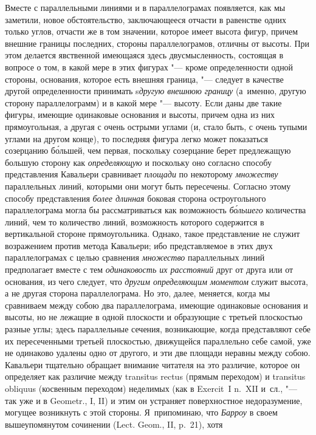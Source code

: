 Вместе с параллельными линиями и в параллелограмах появляется, как мы заметили,
новое обстоятельство, заключающееся отчасти в равенстве одних только углов,
отчасти же в том значении, которое имеет высота фигур, причем внешние границы
последних, стороны параллелограмов, отличны от высоты. При этом делается
явственной имеющаяся здесь двусмысленность, состоящая в вопросе о том, в какой
мере в этих фигурах "--- кроме определенности одной стороны, основания, которое
есть внешняя граница, "--- следует в качестве другой определенности принимать
s{\em другую внешнюю границу} (а~именно, другую сторону параллелограмм) и в
какой мере "--- высоту. Если даны две такие фигуры, имеющие одинаковые
основания и высоты, причем одна из них прямоугольная, а другая с очень острыми
углами (и, стало быть, с очень тупыми углами на другом конце), то последняя
фигура легко может показаться созерцанию б\'{о}льшей, чем первая, поскольку
созерцание берет предлежащую большую сторону как {\em определяющую} и поскольку
оно согласно способу представления Кавальери сравнивает {\em площади} по
некоторому {\em множеству} параллельных линий, которыми они могут быть
пересечены. Согласно этому способу представления {\em более длинная} боковая
сторона остроугольного параллелограма могла бы рассматриваться как возможность
{\em б\'{о}льшего} количества линий, чем то количество линий, возможность
которого содержится в вертикальной стороне прямоугольника. Однако, такое
представление не служит возражением против метода Кавальери; ибо представляемое
в этих двух параллелограмах с целью сравнения {\em множество} параллельных
линий предполагает вместе с тем {\em одинаковость их расстояний} друг от друга
или от основания, из чего следует, что {\em другим определяющим моментом}
служит высота, а не другая сторона параллелограма. Но это, далее, меняется,
когда мы сравниваем между собою два параллелограма, имеющие одинаковые
основания и высоты, но не лежащие в одной плоскости и образующие с третьей
плоскостью разные углы; здесь параллельные сечения, возникающие, когда
представляют себе их пересеченными третьей плоскостью, движущейся параллельно
себе самой, уже не одинаково удалены одно от другого, и эти две площади неравны
между собою. Кавальери тщательно обращает внимание читателя на это различие,
которое он определяет как различие между transitus rectus (прямым переходом) и
transitus obliquus (косвенным переходом) неделимых (как в Exercit~I n.~XII
и~сл., "--- так уже и в Geometr., I, II) и этим он устраняет поверхностное
недоразумение, могущее возникнуть с этой стороны. Я~припоминаю, что
{\em Барроу} в своем вышеупомянутом сочинении (Lect. Geom., II, p.~21), хотя
